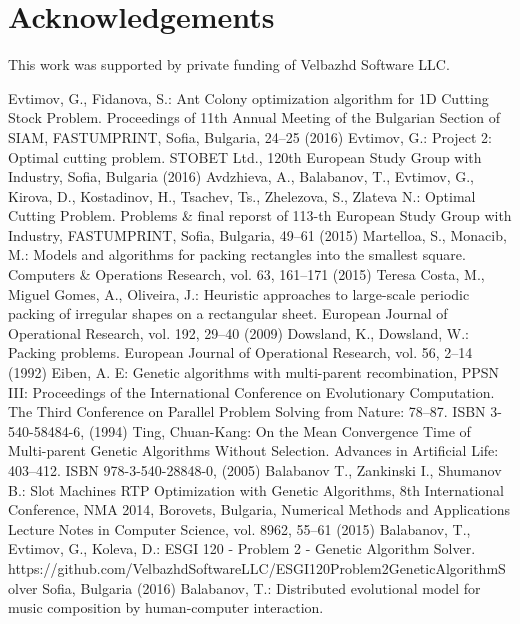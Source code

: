 \documentclass{llncs}
\begin{document}
\section*{Acknowledgements}
%
%
This work was supported by private funding of Velbazhd Software LLC.
%
%
\begin{thebibliography}{}
%
Evtimov, G., Fidanova, S.:
Ant Colony optimization algorithm for 1D Cutting Stock Problem.
Proceedings of 11th Annual Meeting of the Bulgarian Section of SIAM, FASTUMPRINT, Sofia, Bulgaria, 24--25 (2016)
%
Evtimov, G.:
Project 2: Optimal cutting problem.
STOBET Ltd., 120th European Study Group with Industry, Sofia, Bulgaria  (2016)
%
Avdzhieva, A., Balabanov, T., Evtimov, G., Kirova, D., Kostadinov, H., Tsachev, Ts., Zhelezova, S., Zlateva N.:
Optimal Cutting Problem.
Problems \& final reporst of 113-th European Study Group with Industry, FASTUMPRINT, Sofia, Bulgaria, 49--61 (2015)
%
Martelloa, S., Monacib, M.:
Models and algorithms for packing rectangles into the smallest square.
Computers \& Operations Research, vol. 63, 161--171 (2015)
%
Teresa Costa, M.,  Miguel Gomes, A., Oliveira, J.:
Heuristic approaches to large-scale periodic packing of irregular shapes on a rectangular sheet.
European Journal of Operational Research, vol. 192, 29--40 (2009)
%
Dowsland, K., Dowsland, W.:
Packing problems.
European Journal of Operational Research, vol. 56, 2--14 (1992)
%
Eiben, A. E:
Genetic algorithms with multi-parent recombination,
PPSN III: Proceedings of the International Conference on Evolutionary Computation. The Third Conference on Parallel Problem Solving from Nature: 78–87. ISBN 3-540-58484-6, (1994)
%
Ting, Chuan-Kang:
On the Mean Convergence Time of Multi-parent Genetic Algorithms Without Selection. Advances in Artificial Life: 403–412. ISBN 978-3-540-28848-0, (2005)
%
Balabanov T., Zankinski I., Shumanov B.:
Slot Machines RTP Optimization with Genetic Algorithms,
8th International Conference, NMA 2014, Borovets, Bulgaria, Numerical Methods and Applications Lecture Notes in Computer Science, vol. 8962, 55--61 (2015)
%
Balabanov, T., Evtimov, G., Koleva, D.:
ESGI 120 - Problem 2 - Genetic Algorithm Solver.
https://github.com/VelbazhdSoftwareLLC/ESGI120Problem2GeneticAlgorithmSolver Sofia, Bulgaria  (2016)
%
Balabanov, T.:
Distributed evolutional model for music composition by human-computer interaction.

\end{thebibliography}
\end{document}
